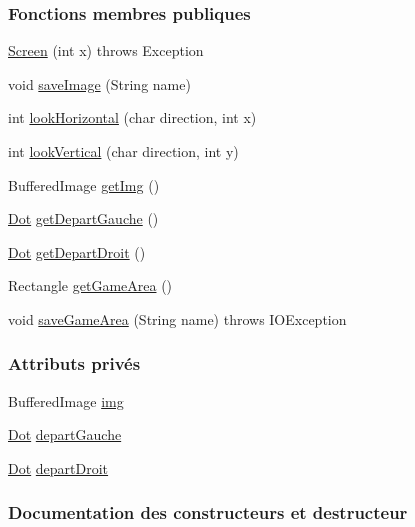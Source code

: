 \subsubsection*{Fonctions membres publiques}
\begin{DoxyCompactItemize}
\item 
\hyperlink{classScreen_a944bda9e3f92c3804a758344452cedec}{Screen} (int x)  throws Exception 
\item 
void \hyperlink{classScreen_ac86eef31557c08cf24587b22167af892}{save\+Image} (String name)
\item 
int \hyperlink{classScreen_a5330c5c05f38882dc5e7afb3a5750ac3}{look\+Horizontal} (char direction, int x)
\item 
int \hyperlink{classScreen_a988aa468f30d44c000e5e65166a9c252}{look\+Vertical} (char direction, int y)
\item 
Buffered\+Image \hyperlink{classScreen_a80867c729d8781977b5d353847401e77}{get\+Img} ()
\item 
\hyperlink{classDot}{Dot} \hyperlink{classScreen_a20e9e14e98b74de7e39512762e591a4a}{get\+Depart\+Gauche} ()
\item 
\hyperlink{classDot}{Dot} \hyperlink{classScreen_a46d5923a97aec72a1924a71544400f5b}{get\+Depart\+Droit} ()
\item 
Rectangle \hyperlink{classScreen_a21dcc1ae9577cd5a3e70903bfbf324f0}{get\+Game\+Area} ()
\item 
void \hyperlink{classScreen_abf1b913aef4cf22fa078e3b613b7adbb}{save\+Game\+Area} (String name)  throws I\+O\+Exception 
\end{DoxyCompactItemize}
\subsubsection*{Attributs privés}
\begin{DoxyCompactItemize}
\item 
Buffered\+Image \hyperlink{classScreen_af49ad57043e65d732b53075fcfc7584c}{img}
\item 
\hyperlink{classDot}{Dot} \hyperlink{classScreen_a41e8f20f41701d5e1143fecb8ed94bb6}{depart\+Gauche}
\item 
\hyperlink{classDot}{Dot} \hyperlink{classScreen_a2567d153a2805a278b88265ea387a7f3}{depart\+Droit}
\end{DoxyCompactItemize}


\subsubsection{Documentation des constructeurs et destructeur}
\hypertarget{classScreen_a944bda9e3f92c3804a758344452cedec}{}
